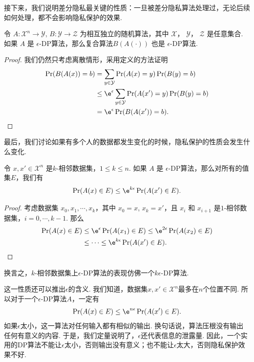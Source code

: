 接下来，我们说明差分隐私最关键的性质：一旦被差分隐私算法处理过，无论后续如何处理，都不会影响隐私保护的效果.

\begin{proposition}[后处理]\label{prop:post-processing}
    令 $A : \mathcal X^n \to \mathcal Y$, $B : \mathcal Y \to \mathcal Z$ 为相互独立的随机算法，其中 $\mathcal X$， $\mathcal Y$， $\mathcal Z$ 是任意集合. 如果 $A$ 是 $\epsilon$-DP算法，那么复合算法$ B(A(\cdot))$ 也是 $\epsilon$-DP算法.
\end{proposition}
\begin{proof}
我们仍然只考虑离散情形，采用定义的方法证明
    \[
    \begin{aligned}
        \Pr(B(A(x)) = b) &= \sum_{y \in \mathcal Y} \Pr(A(x) = y) \Pr(B(y) = b) \\
        &\leq \e^{\epsilon} \sum_{y\in \mathcal Y}\Pr(A(x') = y)\Pr(B(y) = b)\\
        &= \e^{\epsilon}\Pr(B(A(x')) = b).
    \end{aligned}
    \]
\end{proof}

最后，我们讨论如果有多个人的数据都发生变化的时候，隐私保护的性质会发生什么变化. 

\begin{proposition}[群体隐私]\label{prop:group-privacy}
    令 $x, x' \in \mathcal X^n$ 是$k$-相邻数据集，$1 \leq k \leq n$. 如果 $A$ 是 $\epsilon$-DP算法，那么对所有的值集$E$，我们有
    \[
    \Pr(A(x) \in E) \leq \e^{k\epsilon}\Pr(A(x') \in E).
    \]
\end{proposition}
\begin{proof}
    考虑数据集 $x_0, x_1, \cdots , x_k$，其中 $x_0 = x$, $x_k = x'$，且 $x_i$ 和 $x_{i+1}$ 是$1$-相邻数据集，$i = 0, \cdots, k-1$. 那么
    \[
    \begin{aligned}
    \Pr(A(x) \in E) &\leq \e^{\epsilon}\Pr(A(x_1) \in E) \leq \e^{2\epsilon}\Pr(A(x_2) \in E)\\
    &\leq \cdots \leq \e^{k\epsilon}\Pr(A(x') \in E).
    \end{aligned}
    \]
\end{proof}

换言之，$k$-相邻数据集上$\epsilon$-DP算法的表现仿佛一个$k\epsilon$-DP算法. 

这一性质还可以推出$\epsilon$的含义. 我们知道，数据集$x, x' \in \mathcal X^n$最多在$n$个位置不同. 所以对于一个$\epsilon$-DP算法$A$，一定有
        \[
        \Pr(A(x) \in E) \leq \e^{n\epsilon}\Pr(A(x') \in E).
        \]
如果$\epsilon$太小，这一算法对任何输入都有相似的输出. 换句话说，算法压根没有输出任何有意义的内容. 于是，我们定量说明了，$\epsilon$还代表信息的泄露量. 因此，一个实用的DP算法不能让$\epsilon$太小，否则输出没有意义；也不能让$\epsilon$太大，否则隐私保护效果不好.


